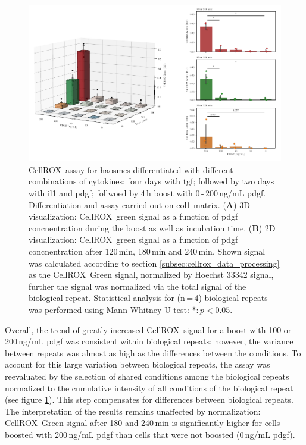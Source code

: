     \begin{figure}[h!]
    \capstart
        \centering
    	\includegraphics{Abbildung/CellROX_titration_norm.pdf}
    	\begin{minipage}{\captionwidth}
    		\caption[cellROX_titration_norm]{ \newline
            CellROX\texttrademark~assay for \acp{haosmc} differentiated with different combinations of cytokines: four days with \ac{tgf}; followed by two days with \ac{il1} and \ac{pdgf}; follwoed by 4\,h boost with 0\,-\,200\,ng/mL \ac{pdgf}. Differentiation and assay carried out on \ac{col1} matrix.
            (\textbf{A}) 3D visualization: CellROX\texttrademark~green signal as a function of \ac{pdgf} concnentration during the boost as well as incubation time.
            (\textbf{B}) 2D visualization: CellROX\texttrademark~green signal as a function of \ac{pdgf} concnentration after 120\,min, 180\,min and 240\,min.
            Shown signal was calculated according to section \ref{subsec:cellrox_data_processing} as the CellROX\texttrademark~Green signal, normalized by Hoechst 33342 signal, further the signal was normalized via the total signal of the biological repeat. Statistical analysis for (n\,=\,4) biological repeats was performed using Mann-Whitney U test: $*: p < 0.05$.}
    		\label{fig:cellROX_titration_norm}
    	\end{minipage}
    \end{figure}

    Overall, the trend of greatly increased CellROX\texttrademark~signal for a boost with 100 or 200\,ng/mL \ac{pdgf} was consistent within biological repeats; however, the variance between repeats was almost as high as the differences between the conditions. To account for this large variation between biological repeats, the assay was reevaluated by the selection of shared conditions among the biological repeats normalized to the cumulative intensity of all conditions of the biological repeat (see figure \ref{fig:cellROX_titration_norm}). This step compensates for differences between biological repeats. The interpretation of the results remains unaffected by normalization: CellROX\texttrademark~Green signal after 180 and 240\,min is significantly higher for cells boosted with 200\,ng/mL \ac{pdgf} than cells that were not boosted (0\,ng/mL \ac{pdgf}).

